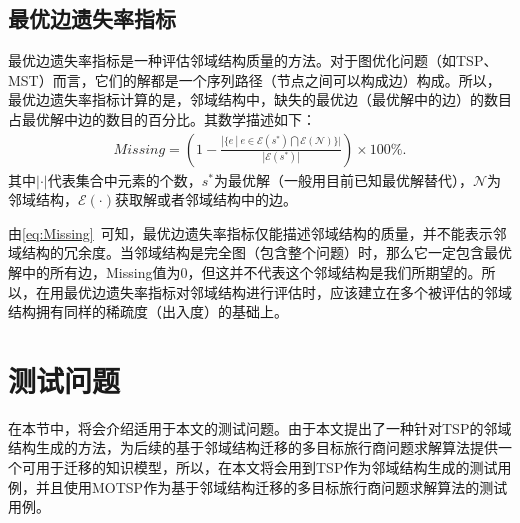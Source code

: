 \subsection{最优边遗失率指标}
\label{subsec:背景介绍:性能评价指标:最优边遗失率指标}
最优边遗失率指标是一种评估邻域结构质量的方法。对于图优化问题（如TSP、MST）而言，它们的解都是一个序列路径（节点之间可以构成边）构成。所以，最优边遗失率指标计算的是，邻域结构中，缺失的最优边（最优解中的边）的数目占最优解中边的数目的百分比。其数学描述如下：
\begin{align}
    \label{eq:Missing}
    Missing = (1 - \frac{|\{ e \ | \ e \in  \mathcal{E} (s^*) \bigcap \mathcal{E} (\mathcal{N}) \} |}{|\mathcal{E} (s^*)|}) \times 100\%.
\end{align}
其中$| \cdot  \vert $代表集合中元素的个数，$s^*$为最优解（一般用目前已知最优解替代），$\mathcal{N}$为邻域结构，$\mathcal{E} (\cdot)$获取解或者邻域结构中的边。
\par
由\autoref{eq:Missing}~可知，最优边遗失率指标仅能描述邻域结构的质量，并不能表示邻域结构的冗余度。当邻域结构是完全图（包含整个问题）时，那么它一定包含最优解中的所有边，Missing值为0，但这并不代表这个邻域结构是我们所期望的。所以，在用最优边遗失率指标对邻域结构进行评估时，应该建立在多个被评估的邻域结构拥有同样的稀疏度（出入度）的基础上。

\section{测试问题}
\label{sec:背景介绍:测试问题}
在本节中，将会介绍适用于本文的测试问题。由于本文提出了一种针对TSP的邻域结构生成的方法，为后续的基于邻域结构迁移的多目标旅行商问题求解算法提供一个可用于迁移的知识模型，所以，在本文将会用到TSP作为邻域结构生成的测试用例，并且使用MOTSP作为基于邻域结构迁移的多目标旅行商问题求解算法的测试用例。

